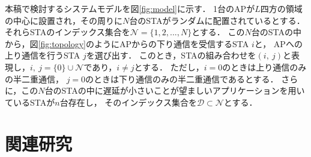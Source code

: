 \documentclass[technicalreport]{ieicej}
\newcommand{\sij}{(i,\ j)}
\newcommand{\mN}{{\mathcal N}}
\begin{document}
	本稿で検討するシステムモデルを図\ref{fig:model}に示す．
	1台のAPが$L$四方の領域の中心に設置され，その周りに$N$台のSTAがランダムに配置されているとする．
	それらSTAのインデックス集合を$\mN=\{1,2,...,N\}$とする．
	この$N$台のSTAの中から，図\ref{fig:topology}のようにAPからの下り通信を受信するSTA $i$と，
	APへの上り通信を行うSTA $j$を選び出す．
	このとき，STAの組み合わせを$\sij$と表現し，$i,\ j=\{0\}\cup \mN$であり，$i\neq j$とする．
	ただし，$i=0$のときは上り通信のみの半二重通信，
	$j=0$のときは下り通信のみの半二重通信であるとする．
	さらに，この$N$台のSTAの中に遅延が小さいことが望ましいアプリケーションを用いているSTAが$n$台存在し，
	そのインデックス集合を${\mathcal D}\subset\mN$とする．

\section{関連研究}
\end{document}
